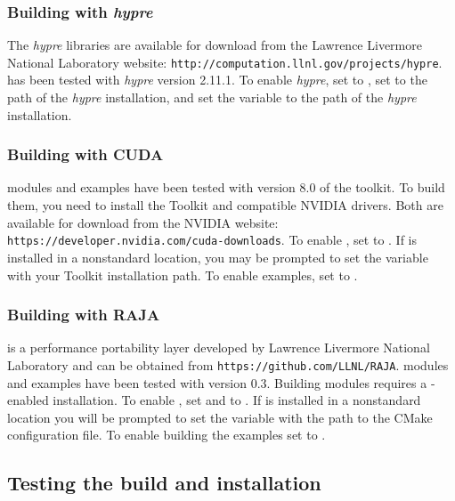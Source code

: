 \subsubsection*{Building with \textit{hypre}}
The \textit{hypre} libraries are available for download from the Lawrence Livermore
National Laboratory website: {\tt http://computation.llnl.gov/projects/hypre}.
{\sundials} has been tested with \textit{hypre} version 2.11.1. 
To enable \textit{hypre}, set   to , set 
to the  path of the \textit{hypre} installation, and set the variable
 to the  path of the \textit{hypre} installation.

\subsubsection*{Building with CUDA}
{\sundials} {\cuda} modules and examples have been tested with version 8.0 of the 
{\cuda} toolkit. To build them, you need to install the Toolkit and compatible
NVIDIA drivers. Both are available for download from the NVIDIA website:
{\tt https://developer.nvidia.com/cuda-downloads}. To enable {\cuda}, 
set  to . If {\cuda} is installed in a
nonstandard location, you may be prompted to set the variable
 with your {\cuda} Toolkit installation
path. To enable {\cuda} examples, set  to .

\subsubsection*{Building with RAJA}
{\raja} is a performance portability layer developed by Lawrence
Livermore National Laboratory and can be obtained from {\tt https://github.com/LLNL/RAJA}.
{\sundials} {\raja} modules and examples have been tested with {\raja}
version 0.3. Building {\sundials} {\raja} modules requires a
{\cuda}-enabled {\raja} installation. To enable {\raja}, set
 and  to . If {\raja} is
installed in a nonstandard location you will be prompted to set the
variable  with the path to the {\raja} CMake
configuration file. To enable building the {\raja} examples set
 to .

\subsection{Testing the build and installation}

